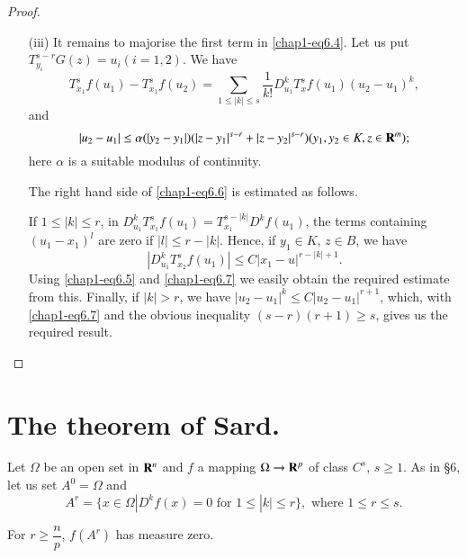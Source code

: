 \begin{proof}
\begin{itemize}
\item[(iii)] It remains to majorise the first term in \eqref{chap1-eq6.4}. Let us put $T^{s-r}_{y_{i}}G(z)=u_{i}(i=1,2)$. We have
\begin{equation}
T^{s}_{x_{1}}f(u_{1})-T^{s}_{x_{1}}f(u_{2})=\sum\limits_{1\leq |k|\leq s}\dfrac{1}{k!}D^{k}_{u_{1}}T^{s}_{x}f(u_{1})(u_{2}-u_{1})^{k},\label{chap1-eq6.6}
\end{equation}
and
\begin{equation}
|u_{2}-u_{1}|\leq \alpha(|y_{2}-y_{1}|)(|z-y_{1}|^{s-r}+|z-y_{2}|^{s-r})(y_{1},y_{2}\in K, z\in \mathbf{R}^{m});\label{chap1-eq6.7}
\end{equation}
here $\alpha$ is a suitable modulus of continuity.

The right hand side of \eqref{chap1-eq6.6} is estimated as follows.

If $1\leq |k|\leq r$, in $D^{k}_{u_{1}}T^{s}_{x_{1}}f(u_{1})=T^{s-|k|}_{x_{1}}D^{k}f(u_{1})$,
the terms containing $(u_{1}-x_{1})^{l}$ are zero if $|l|\leq r-|k|$. Hence, if $y_{1}\in K$, $z\in B$, we have
$$
|D^{k}_{u_{1}}T^{s}_{x_{2}}f(u_{1})|\leq C|x_{1}-u|^{r-|k|+1}.
$$
Using \eqref{chap1-eq6.5} and \eqref{chap1-eq6.7} we easily obtain the required estimate from this. Finally, if $|k|>r$, we have $|u_{2}-u_{1}|^{k}\leq C|u_{2}-u_{1}|^{r+1}$, which, with \eqref{chap1-eq6.7} and the obvious inequality $(s-r)(r+1)\geq s$, gives us the required result.
\end{itemize}
\end{proof}

\section[The theorem of Sard]{The theorem of Sard.}\label{chap1-sec7}
\pageoriginale
Let $\Omega$ be an open set in $\mathbf{R}^{n}$ and $f$ a mapping $\Omega\to \mathbf{R}^{p}$ of class $C^{s}$, $s\geq 1$. As in \S6, let us set $A^{0}=\Omega$ and 
$$
A^{r}=\{x\in \Omega|D^{k}f(x)=0\text{ for } 1\leq |k|\leq r\}, \text{ where } 1\leq r\leq s.
$$

\begin{lemma}\label{chap1-lem7.1}
For $r\geq \dfrac{n}{p}$, $f(A^{r})$ has measure zero.
\end{lemma}

